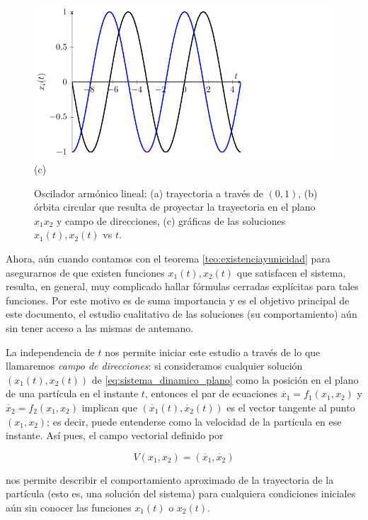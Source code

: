 \documentclass[11pt]{book}
\theoremstyle{definition}
\numberwithin{definition}{section}
\theoremstyle{theorem}
\numberwithin{theorem}{section}
\numberwithin{lemma}{section}
\numberwithin{corollary}{section}
\theoremstyle{plain}
\numberwithin{example}{section}
\begin{document}
\begin{figure}
    \includegraphics[scale=1.0]{figures/osciladorarmonico-soluciones.pdf}\\(c) \\
    \caption{Oscilador armónico lineal: (a) trayectoria a través de $(0,1)$, (b) órbita circular que resulta de proyectar la trayectoria en el plano $x_1x_2$ y campo de direcciones, (c) gráficas de las soluciones $x_1(t), x_2(t)$ vs $t$.}
\end{figure}

Ahora, aún cuando contamos con el teorema \ref{teo:existenciayunicidad} para asegurarnos de que existen funciones $x_1(t), x_2(t)$ que satisfacen el sistema, resulta, en general, muy complicado hallar fórmulas cerradas explícitas para tales funciones. Por este motivo es de suma importancia y es el objetivo principal de este documento, el estudio cualitativo de las soluciones (su comportamiento) aún sin tener acceso a las mismas de antemano.

La independencia de $t$ nos permite iniciar este estudio a través de lo que llamaremos \emph{campo de direcciones}: si consideramos cualquier solución $(x_1(t),x_2(t))$ de \ref{eq:sistema_dinamico_plano} como la posición en el plano de una partícula en el instante $t$, entonces el par de ecuaciones $\dot{x_1} = f_1(x_1,x_2)$ y $\dot{x_2} = f_2(x_1,x_2)$ implican que $(\dot{x_1}(t),\dot{x_2}(t))$ es el vector tangente al punto $(x_1,x_2)$; es decir, puede entenderse como la velocidad de la partícula en ese instante. Así pues, el campo vectorial definido por 

$$ V(x_1,x_2) = (\dot{x_1}, \dot{x_2})$$

nos permite describir el comportamiento aproximado de la trayectoria de la partícula (esto es, una solución del sistema) para cualquiera condiciones iniciales aún sin conocer las funciones $x_1(t)$ o $x_2(t)$.
\end{document}
